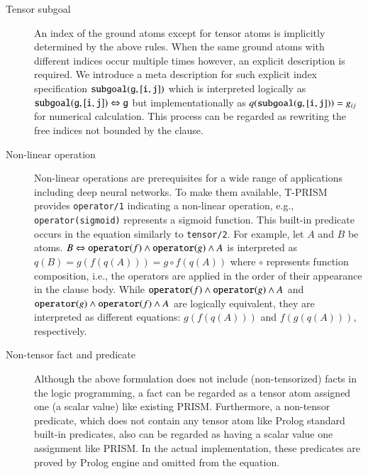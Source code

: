 \documentclass[a4paper]{report}
\begin{document}
\begin{description}
	\item [Tensor subgoal]
	An index  of the ground  atoms except  for tensor atoms  is implicitly
	determined  by  the above  rules.  When  the  same ground  atoms  with
	different   indices  occur   multiple  times   however,  an   explicit
	description is  required.  We  introduce a  meta description  for such
	explicit  index   specification  ${\tt  subgoal(g,[i,j])}$   which  is
	interpreted  logically as  ${\tt subgoal(g,  [i, j])}  \Leftrightarrow
	{\tt g}$ but  implementationally as $q({\tt subgoal(g,[i,j])})=g_{ij}$
	for numerical calculation.  This process can be  regarded as rewriting
	the free indices not bounded by the clause.

	\item [Non-linear operation]
	Non-linear  operations   are  prerequisites   for  a  wide   range  of
	applications including  deep neural networks. To  make them available,
	T-PRISM provides  {\tt operator/1} indicating a  non-linear operation,
	e.g.,  {\tt operator(sigmoid)}  represents  a  sigmoid function.  This
	built-in predicate occurs in the equation similarly to {\tt tensor/2}.
	For example, let $A$ and $B$ be atoms.  $B \Leftrightarrow {\tt
		operator}(f) \wedge {\tt operator}(g) \wedge A$ is interpreted as
	$q(B) = g(f(q(A))) = g \circ f (q(A))$ where $\circ$ represents
	function composition, i.e., the operators are applied in the order of
	their appearance in the clause body.  While ${\tt operator}(f)\wedge
	{\tt operator}(g) \wedge A$ and ${\tt operator}(g)\wedge {\tt
		operator}(f) \wedge A$ are logically equivalent, they are interpreted
	as different equations: $g(f(q(A)))$ and $f(g(q(A)))$, respectively.

	\item [Non-tensor fact and predicate]
	Although the above formulation does not include (non-tensorized) facts
	in the  logic programming,  a fact  can be regarded  as a  tensor atom
	assigned one (a scalar value) like existing PRISM.  Furthermore, a
	non-tensor  predicate, which  does not  contain any  tensor atom  like
	Prolog standard built-in predicates, also  can be regarded as having a
	scalar value one assignment like  PRISM. In the actual implementation,
	these  predicates are  proved by  Prolog engine  and omitted  from the
	equation.
\end{description}
\end{document}
